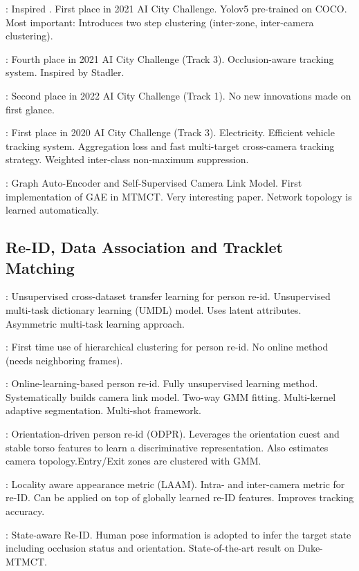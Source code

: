 \cite{Lui21}: Inspired \cite{Specker22}. First place in 2021 AI City Challenge. Yolov5 pre-trained on COCO. Most important: Introduces two step clustering (inter-zone, inter-camera clustering).

\cite{Specker21}: Fourth place in 2021 AI City Challenge (Track 3). Occlusion-aware tracking system. Inspired by Stadler.

\cite{Li22a}: Second place in 2022 AI City Challenge (Track 1). No new innovations made on first glance.

\cite{Qian20}: First place in 2020 AI City Challenge (Track 3). Electricity. Efficient vehicle tracking system. Aggregation loss and fast multi-target cross-camera tracking strategy. Weighted inter-class non-maximum suppression.

\cite{Hsu22}: Graph Auto-Encoder and Self-Supervised Camera Link Model. First implementation of GAE in MTMCT. Very interesting paper. Network topology is learned automatically.

\subsection{Re-ID, Data Association and Tracklet Matching}

\cite{Peng16}: Unsupervised cross-dataset transfer learning for person re-id. Unsupervised multi-task dictionary learning (UMDL) model. Uses latent attributes. Asymmetric multi-task learning approach.

\cite{Zhang17}: First time use of hierarchical clustering for person re-id. No online method (needs neighboring frames).

\cite{Lee18}: Online-learning-based person re-id. Fully unsupervised learning method. Systematically  builds camera link model. Two-way GMM fitting. Multi-kernel adaptive segmentation. Multi-shot framework.

\cite{Jiang18}: Orientation-driven person re-id (ODPR). Leverages the orientation cuest and stable torso features to learn a discriminative representation. Also estimates camera topology.Entry/Exit zones are clustered with GMM.

\cite{Hou19}: Locality aware appearance metric (LAAM). Intra- and inter-camera metric for re-ID. Can be applied on top of globally learned re-ID features. Improves tracking accuracy.

\cite{Li19}: State-aware Re-ID. Human pose information is adopted to infer the target state including occlusion status and orientation. State-of-the-art result on Duke-MTMCT.

